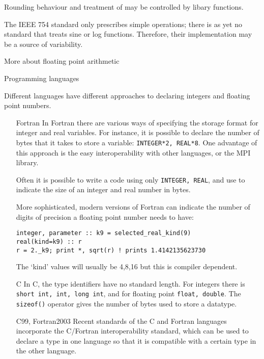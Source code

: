 Rounding behaviour and treatment of 
may be controlled by libary functions.

The IEEE 754 standard only prescribes simple operations;
there is as yet no standard that treats sine or log functions.
Therefore, their implementation may be a source of variability.


 {More about floating point arithmetic}

 {Programming languages}

Different languages have different approaches to declaring integers and
floating point numbers.
\begin{itemize}
\item [Fortran] In Fortran there are
  various ways of specifying the storage format for integer and real
  variables. For instance, it is possible to declare
   the number of bytes that it takes to store a variable:
  \texttt{INTEGER*2, REAL*8}. One advantage of this approach is the
  easy interoperability with other languages, or the MPI library.

  Often it is possible to write a code
  using only \texttt{INTEGER, REAL}, and use
   to indicate the size of an integer
  and real number in bytes.

  More sophisticated, modern versions of Fortran can indicate the
  number of digits of precision a floating point number needs to have:
\begin{verbatim}
integer, parameter :: k9 = selected_real_kind(9)
real(kind=k9) :: r
r = 2._k9; print *, sqrt(r) ! prints 1.4142135623730
\end{verbatim}
  The `kind' values will usually be 4,8,16 but this is compiler
  dependent.
\item [C] In C, the type identifiers have no standard length. For
  integers there is \texttt{short int, int, long int}, and for
  floating point \texttt{float, double}. The \texttt{sizeof()}
  operator gives the number of bytes used to store a datatype.
\item [C99, Fortran2003] Recent standards of the C and Fortran
  languages incorporate the C/Fortran interoperability standard, which
  can be used to declare a type in one language so that it is
  compatible with a certain type in the other language.
\end{itemize}

